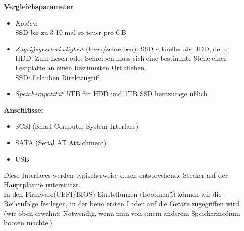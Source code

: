 \textbf{Vergleichsparameter}
\begin{itemize}
	\item \textit{Kosten}:\\
	SSD bis zu 3-10 mal so teuer pro GB
	\item \textit{Zugriffsgeschwindigkeit} (lesen/schreiben): SSD schneller als HDD, denn\\
	 HDD: Zum Lesen oder Schreiben muss sich eine bestimmte Stelle einer Festplatte an einen bestimmten Ort drehen.\\
	 SSD: Erlauben Direktzugriff.
	\item \textit{Speicherapazität}: 5TB für HDD und 1TB SSD heutzutage üblich\\
\end{itemize}
\textbf{Anschlüsse:}
\begin{itemize}
	\item SCSI (Small Computer System Interface) 
	\item SATA (Serial AT Attachment) 
	\item USB
\end{itemize}
Diese Interfaces werden typischerweise durch entsprechende Stecker auf der Hauptplatine unterstützt.\\
In den Firmware(UEFI/BIOS)-Einstellungen (Bootmenü) können wir die Reihenfolge festlegen, in der beim ersten Laden auf die Geräte zugegriffen wird (wie oben erwähnt: Notwendig, wenn man von einem anderem Speichermedium booten möchte.)
~\\


